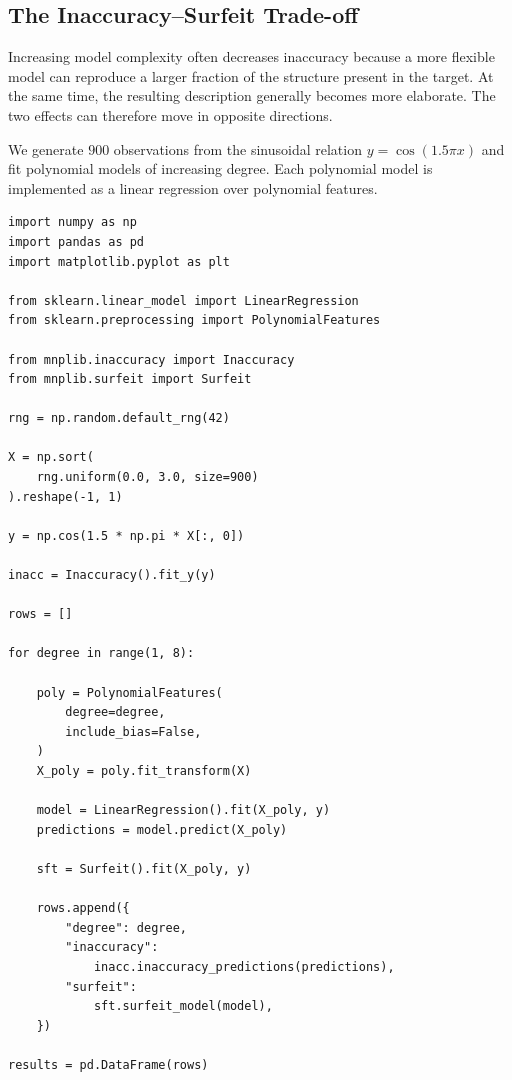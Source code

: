 
\subsection*{The Inaccuracy--Surfeit Trade-off}

Increasing model complexity often decreases inaccuracy because a more flexible model can reproduce a larger fraction of the structure present in the target. At the same time, the resulting description generally becomes more elaborate. The two effects can therefore move in opposite directions.

\begin{example}
\label{ex:machine_learning:surfeit:polynomial}

We generate $900$ observations from the sinusoidal relation $y=\cos(1.5\pi x)$ and fit polynomial models of increasing degree. Each polynomial model is implemented as a linear regression over polynomial features.

\begin{sourcecode}
{\scriptsize
\begin{verbatim}
import numpy as np
import pandas as pd
import matplotlib.pyplot as plt

from sklearn.linear_model import LinearRegression
from sklearn.preprocessing import PolynomialFeatures

from mnplib.inaccuracy import Inaccuracy
from mnplib.surfeit import Surfeit

rng = np.random.default_rng(42)

X = np.sort(
    rng.uniform(0.0, 3.0, size=900)
).reshape(-1, 1)

y = np.cos(1.5 * np.pi * X[:, 0])

inacc = Inaccuracy().fit_y(y)

rows = []

for degree in range(1, 8):

    poly = PolynomialFeatures(
        degree=degree,
        include_bias=False,
    )
    X_poly = poly.fit_transform(X)

    model = LinearRegression().fit(X_poly, y)
    predictions = model.predict(X_poly)

    sft = Surfeit().fit(X_poly, y)

    rows.append({
        "degree": degree,
        "inaccuracy":
            inacc.inaccuracy_predictions(predictions),
        "surfeit":
            sft.surfeit_model(model),
    })

results = pd.DataFrame(rows)


\end{verbatim}}
\end{sourcecode}
\end{example}
